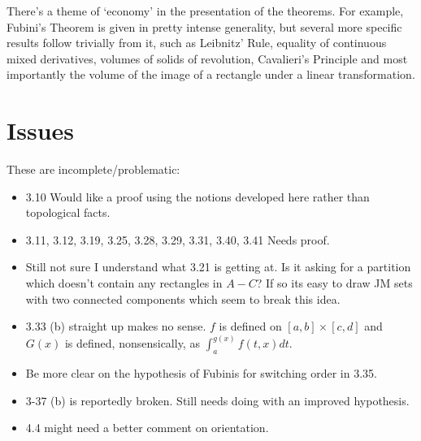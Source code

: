 \documentclass[20pt]{article}
\theoremstyle{plain}
\theoremstyle{definition}
\begin{document}
There's a theme of `economy' in the presentation of the theorems.
For example, Fubini's Theorem is given in pretty intense generality, 
but several more specific results follow trivially from it, 
such as Leibnitz' Rule, equality of continuous mixed derivatives,
volumes of solids of revolution, Cavalieri's Principle and most importantly 
the volume of the image of a rectangle under a linear transformation.




















































\section{Issues}



These are incomplete/problematic:
\begin{itemize}
  \item 3.10 Would like a proof using the notions developed here rather than 
  topological facts.
  \item 3.11, 3.12, 3.19, 3.25, 3.28, 3.29, 3.31, 3.40, 3.41 Needs proof.
  \item Still not sure I understand what 3.21 is getting at.  Is it asking for a partition 
  which doesn't contain any rectangles in $A-C$? If so its easy to 
  draw JM sets with two connected components which seem to break this idea.
  \item 3.33 (b) straight up makes no sense. $f$ is defined on $[a, b] \times [c, d]$
  and $G(x)$ is defined, nonsensically, as $\int_a^{g(x)}f(t, x)dt$.
  \item Be more clear on the hypothesis of Fubinis for switching order in 3.35.
  \item 3-37 (b) is reportedly broken. Still needs doing with an improved 
  hypothesis.
  \item 4.4 might need a better comment on orientation.
\end{itemize}
\end{document}
